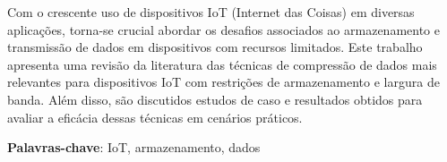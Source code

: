 \documentclass{TCC_UP}
\begin{document}
%

    \setlength{\absparsep}{18pt}
    \begin{resumo}
        Com o crescente uso de dispositivos IoT (Internet das Coisas) em diversas aplicações, torna-se crucial abordar os desafios associados ao armazenamento e transmissão de dados em dispositivos com recursos limitados. Este trabalho apresenta uma revisão da literatura das técnicas de compressão de dados mais relevantes para dispositivos IoT com restrições de armazenamento e largura de banda. Além disso, são discutidos estudos de caso e resultados obtidos para avaliar a eficácia dessas técnicas em cenários práticos.

        \textbf{Palavras-chave}: IoT, armazenamento, dados
    \end{resumo}
\end{document}
